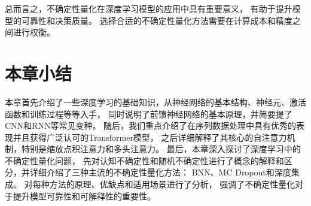 总而言之，不确定性量化在深度学习模型的应用中具有重要意义，
有助于提升模型的可靠性和决策质量。
选择合适的不确定性量化方法需要在计算成本和精度之间进行权衡。

\section{本章小结}

本章首先介绍了一些深度学习的基础知识，从神经网络的基本结构、神经元、激活函数和训练过程等等入手，
同时说明了前馈神经网络的基本原理，并简要提了CNN和RNN等常见变种。
随后，我们重点介绍了在序列数据处理中具有优秀的表现并且获得广泛认可的Transformer模型，
之后详细解释了其核心的自注意力机制，特别是缩放点积注意力和多头注意力。
最后，本章深入探讨了深度学习中的不确定性量化问题，
先对认知不确定性和随机不确定性进行了概念的解释和区分，并详细介绍了三种主流的不确定性量化方法：
BNN、MC Dropout和深度集成。
对每种方法的原理、优缺点和适用场景进行了分析，
强调了不确定性量化对于提升模型可靠性和可解释性的重要性。

